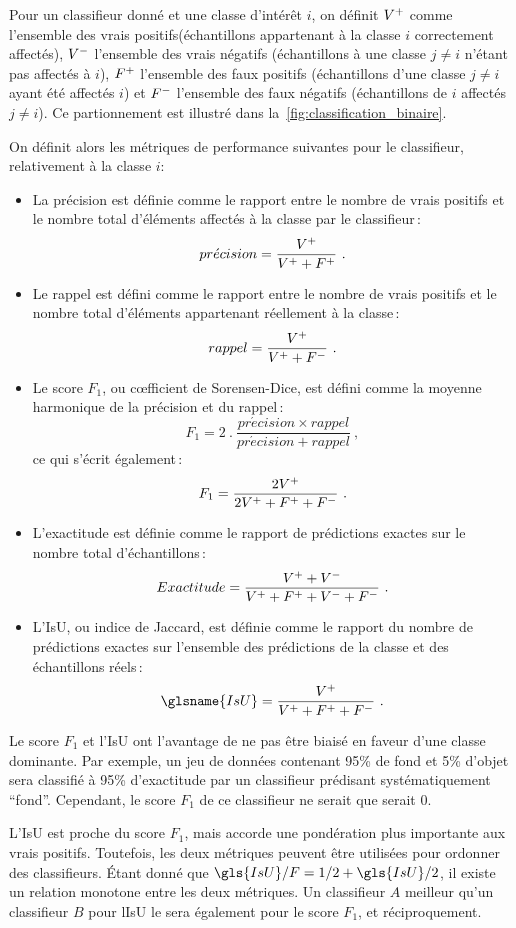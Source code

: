 Pour un classifieur donné et une classe d'intérêt $i$, on définit $V^+$ comme l'ensemble des vrais positifs(échantillons appartenant à la classe $i$ correctement affectés), $V^-$ l'ensemble des vrais négatifs (échantillons à une classe $j \neq i$ n'étant pas affectés à $i$), $F^+$ l'ensemble des faux positifs (échantillons d'une classe $j \neq i$ ayant été affectés $i$) et $F^-$ l'ensemble des faux négatifs (échantillons de $i$ affectés $j \neq i$). Ce partionnement est illustré dans la~\cref{fig:classification_binaire}.

On définit alors les métriques de performance suivantes pour le classifieur, relativement à la classe $i$:
\begin{itemize}
	\item La précision est définie comme le rapport entre le nombre de vrais positifs et le nombre total d'éléments affectés à la classe par le classifieur\,:
  $$pr\acute{e}cision = \frac{V^+}{V^+ + F^+}~.$$
	\item Le rappel est défini comme le rapport entre le nombre de vrais positifs et le nombre total d'éléments appartenant réellement à la classe\,:
  $$rappel = \frac{V^+}{V^+ + F^-}~.$$
	\item Le score $F_1$, ou c\oe{}fficient de Sorensen-Dice, est défini comme la moyenne harmonique de la précision et du rappel\,:
  $$F_1 = 2~.~\frac{pr\acute{e}cision \times rappel}{pr\acute{e}cision + rappel}~,$$
  ce qui s'écrit également\,:
  $$F_1 = \frac{2 V^+}{2 V^+ + F^+ + F^-}~.$$
	\item L'exactitude est définie comme le rapport de prédictions exactes sur le nombre total d'échantillons\,:
  $$Exactitude = \frac{V^+ + V^-}{V^+ + F^+ + V^- + F^-}~.$$
	\item L'\gls{IsU}, ou indice de Jaccard, est définie comme le rapport du nombre de prédictions exactes sur l'ensemble des prédictions de la classe et des échantillons réels\,:
  $$\glsname{IsU} = \frac{\tp}{\tp + \fp + \fn}~.$$
\end{itemize}

Le score $F_1$ et l'\gls{IsU} ont l'avantage de ne pas être biaisé en faveur d'une classe dominante. Par exemple, un jeu de données contenant 95\% de fond et 5\% d'objet sera classifié à 95\% d'exactitude par un classifieur prédisant systématiquement ``fond''. Cependant, le score $F_1$ de ce classifieur ne serait que serait $0$.

L'\gls{IsU} est proche du score $F_1$, mais accorde une pondération plus importante aux vrais positifs. Toutefois, les deux métriques peuvent être utilisées pour ordonner des classifieurs. Étant donné que $\gls{IsU}/F = 1/2 + \gls{IsU}/2$, il existe un relation monotone entre les deux métriques. Un classifieur $A$ meilleur qu'un classifieur $B$ pour l\gls{IsU} le sera également pour le score $F_1$, et réciproquement.

